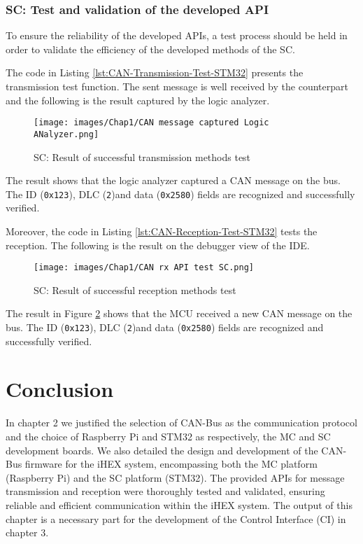 \subsubsection{SC: Test and validation of the developed API}
To ensure the reliability of the developed APIs, a test process should be held in order to validate the efficiency of the developed methods of the SC.

The code in Listing \ref{lst:CAN-Transmission-Test-STM32} presents the transmission test function. The sent message is well received by the counterpart and the  following is the result captured by the logic analyzer.

\begin{figure}[H]
\begin{center}
\texttt{[image: images/Chap1/CAN message captured Logic ANalyzer.png]}\\
\caption{SC: Result of successful transmission methods test}
\label{tx API test on STM32}
\end{center}
\end{figure}

The result shows that the logic analyzer captured a CAN message on the bus. The ID (\texttt{0x123}), DLC (\texttt{2})and data (\texttt{0x2580}) fields are recognized and successfully verified.

Moreover, the code in Listing \ref{lst:CAN-Reception-Test-STM32} tests the reception. The  following is the result on the debugger view of the IDE.

\begin{figure}[H]
\begin{center}
\texttt{[image: images/Chap1/CAN rx API test SC.png]}\\
\caption{SC: Result of successful reception methods test}
\label{SC rx result}
\end{center}
\end{figure}

The result in Figure \ref{SC rx result} shows that the MCU received a new CAN message on the bus. The ID (\texttt{0x123}), DLC (\texttt{2})and data (\texttt{0x2580}) fields are recognized and successfully verified.

\section*{Conclusion}
In chapter 2 we justified the selection of CAN-Bus as the communication protocol and the choice of Raspberry Pi and STM32 as respectively, the MC and SC development boards. We also detailed the design and development of the CAN-Bus firmware for the iHEX system, encompassing both the MC platform (Raspberry Pi) and the SC platform (STM32).  The provided APIs for message transmission and reception were thoroughly tested and validated, ensuring reliable and efficient communication within the iHEX system. The output of this chapter is a necessary part for the development of the Control Interface (CI) in chapter 3. 


